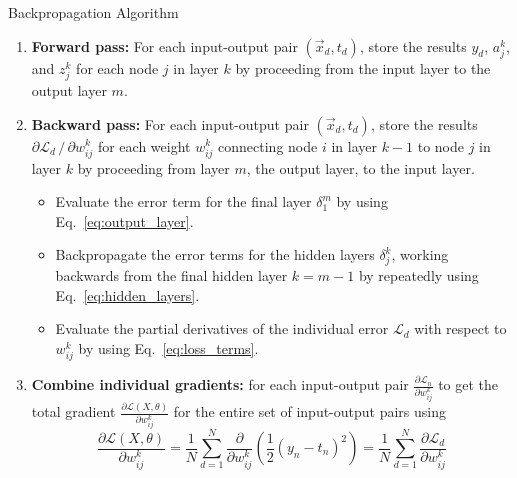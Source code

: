 \documentclass[../main.tex]{subfiles}
\begin{document}
%
\begin{algorithm}[htpb]
    \AlgoDontDisplayBlockMarkers\SetAlgoNoEnd\SetAlgoNoLine%
    \DontPrintSemicolon%
    \caption{Backpropagation Algorithm}%
    \;
    \begin{enumerate}
      \item \textbf{Forward pass:} For each input-output pair $(\vec{x}_{d},
        t_{d})$, store the results $y_{d}$, $a_{j}^{k}$, and $z_{j}^{k}$ for
        each node $j$ in layer $k$ by proceeding from the input layer to the
        output layer $m$.\;
      \item \textbf{Backward pass:} For each input-output pair $(\vec{x}_{d},
        t_{d})$, store the results $\partial \mathcal{L}_{d}\,/\, \partial
        w_{ij}^{k}$ for each weight $w_{ij}^{k}$ connecting node $i$ in layer
        $k - 1$ to node $j$ in layer $k$ by proceeding from layer $m$, the
        output layer, to the input layer.\;
        \begin{itemize}
          \item Evaluate the error term for the final layer $\delta_{1}^{m}$ by
            using Eq.~\ref{eq:output_layer}.\;
          \item Backpropagate the error terms for the hidden layers
            $\delta_{j}^{k}$, working backwards from the final hidden layer $k
            = m - 1$ by repeatedly using Eq.~\ref{eq:hidden_layers}.\;
          \item Evaluate the partial derivatives of the individual error
            $\mathcal{L}_{d}$ with respect to $w_{ij}^{k}$ by using
            Eq.~\ref{eq:loss_terms}.\;
        \end{itemize}
      \item \textbf{Combine individual gradients:} for each input-output pair
        $\frac{\partial \mathcal{L}_{n}}{\partial w_{ij}^{k}}$ to get the total
        gradient $\frac{\partial \mathcal{L}(X, \theta)}{\partial w_{ij}^{k}}$
        for the entire set of input-output pairs using\;
        \begin{equation*}
          \frac{\partial \mathcal{L}(X, \theta)}{\partial w_{ij}^{k}} 
          = \frac{1}{N}\sum_{d=1}^{N}\frac{\partial}{\partial w_{ij}^{k}}
            {\left(\frac{1}{2}{(y_n - t_{n})}^{2}\right)} 
          = \frac{1}{N}\sum_{d=1}^{N}\frac{\partial \mathcal{L}_{d}}{\partial
            w_{ij}^{k}}
        \end{equation*}
    \end{enumerate}%
\label{alg:backprop_algorithm}
\end{algorithm}
\end{document}
